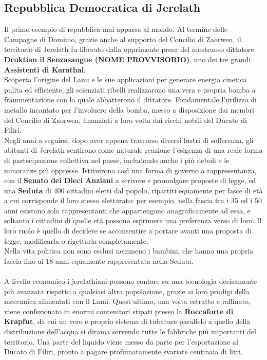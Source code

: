 \documentclass[a4paper]{scrreprt}
\begin{document}
\subsection{Repubblica Democratica di Jerelath}
Il primo esempio di repubblica mai apparsa al mondo. Al termine delle Campagne di Dominio, grazie anche al supporto del Concilio di Zaorwen, il territorio di Jerelath fu liberato dalla opprimente presa del mostruoso dittatore \textbf{Druktian il Senzasangue (NOME PROVVISORIO)}, uno dei tre grandi \textbf{Assistenti di Karathal}.\\ 
Scoperta l'origine del Lami e le sue applicazioni per generare energia cinetica pulita ed efficiente, gli scienziati ribelli realizzarono una vera e propria bomba a frammentazione con la quale abbatterono il dittatore. Fondamentale l'utilizzo di metallo incantato per l'involucro della bomba, messo a disposizione dai membri del Concilio di Zaorwen, finanziati a loro volta dai ricchi nobili del Ducato di Filiri.\\
Negli anni a seguirsi, dopo aver appena trascorso diversi lustri di sofferenza, gli abitanti di Jerelath sentirono come naturale reazione l'esigenza di una reale forma di partecipazione collettiva nel paese, includendo anche i più deboli e le minoranze più oppresse. Istituirono così una forma di governo a rappresentanza, con il \textbf{Senato dei Dieci Anziani} a scrivere e promulgare proposte di legge, ed una \textbf{Seduta} di 400 cittadini eletti dal popolo, ripartiti equamente per fasce di età a cui corrisponde il loro stesso elettorato: per esempio, nella fascia tra i 35 ed i 50 anni esistono solo rappresentanti che appartengono anagraficamente ad essa, e soltanto i cittadini di quelle età possono esprimere una preferenza verso di loro. 
Il loro ruolo è quello di decidere se acconsentire a portare avanti una proposta di legge, modificarla o rigettarla completamente.\\
Nella vita politica non sono esclusi nemmeno i bambini, che hanno una propria fascia fino ai 18 anni equamente rappresentata nella Seduta.\\
\\
A livello economico i jerelathiani possono contare su una tecnologia decisamente più avanzata rispetto a qualsiasi altra popolazione, grazie ai loro prodigi della meccanica alimentati con il Lami. Quest'ultimo, una volta estratto e raffinato, viene confezionato in enormi contenitori stipati presso la \textbf{Roccaforte di Krapfut}, da cui un vero e proprio sistema di tubature parallelo a quello della distribuzione dell'acqua si dirama servendo tutte le fabbriche più importanti del territorio. Una parte del liquido viene messo da parte per l'esportazione al Ducato di Filiri, pronto a pagare profumatamente svariate centinaia di litri.\\
\end{document}
